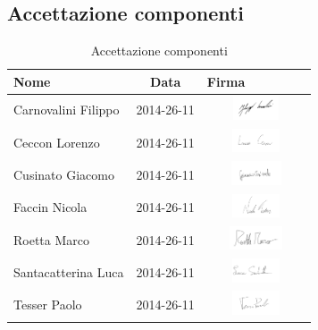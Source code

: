 	\subsection{Accettazione componenti} %
	\label{sub:accettazione_componenti}
		\begin{table}[!h]
			\begin{center}
				\begin{tabularx}{0.8\textwidth}{|p{5cm}|c|X|}
					\hline
					\textbf{Nome} & \textbf{Data} & \textbf{Firma} \\
					\hline
					\rule[-4mm]{0mm}{1cm}
					Carnovalini Filippo &
					2014-26-11 &
					\includegraphics[height=0.7cm,width=2.9cm]{./images/firme/filippo.png} \\
					\hline
					\rule[-4mm]{0mm}{1cm}
					Ceccon Lorenzo &
					2014-26-11 &
					\includegraphics[height=0.7cm,width=2.9cm]{./images/firme/lorenzo.png} \\
					\hline
					\rule[-4mm]{0mm}{1cm}
					Cusinato Giacomo &
					2014-26-11 &
					\includegraphics[height=0.7cm,width=2.9cm]{./images/firme/giacomo.png} \\
					\hline
					\rule[-4mm]{0mm}{1cm}
					Faccin Nicola &
					2014-26-11 &
					\includegraphics[height=0.7cm,width=2.9cm]{./images/firme/nicola.png} \\
					\hline
					\rule[-4mm]{0mm}{1cm}
					Roetta Marco &
					2014-26-11 &
					\includegraphics[height=0.7cm,width=2.9cm]{./images/firme/marco.png} \\
					\hline
					\rule[-4mm]{0mm}{1cm}
					Santacatterina Luca &
					2014-26-11 &
					\includegraphics[height=0.7cm,width=2.9cm]{./images/firme/luca.png} \\
					\hline
					\rule[-4mm]{0mm}{1cm}
					Tesser Paolo &
					2014-26-11 &
					\includegraphics[height=0.7cm,width=2.9cm]{./images/firme/paolo.png} \\
					\hline
				\end{tabularx}
			\end{center}
		\caption{Accettazione componenti}
		\end{table}
	
